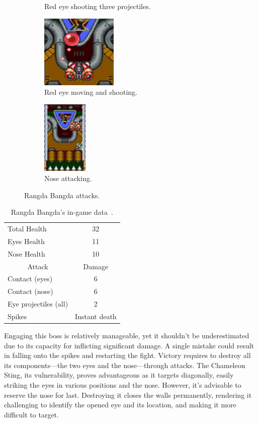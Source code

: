 \begin{figure}[htp]
\begin{subfigure}[t]{0.30\linewidth}
		\caption{Red eye shooting three projectiles.}
	\end{subfigure}
	\begin{subfigure}{0.40\linewidth}
		\centering
		\includegraphics[height=3.5cm]{figures/X1/Sigma_stages/Rangda_red_2.jpg}
		\caption{Red eye moving and shooting.}
	\end{subfigure}
	\begin{subfigure}{0.30\linewidth}
		\centering
		\includegraphics[height=3.5cm]{figures/X1/Sigma_stages/Rangda_nose.jpg}
		\caption{Nose attacking.}
	\end{subfigure}
	\caption{Rangda Bangda attacks.}
\end{figure} 
\begin{table}[htp]
	\centering
	\begin{tabular}[h]{l c}
		\toprule
		Total Health  & 32\\
		Eyes Health & 11\\
		Nose Health & 10\\
		\midrule
		\multicolumn{1}{c}{Attack} & \multicolumn{1}{c}{Damage}\\
		Contact (eyes) & 6\\
		Contact (nose) & 6\\
		Eye projectiles (all) & 2\\
		Spikes & Instant death\\
		\bottomrule
	\end{tabular}
	\caption{Rangda Bangda's in-game data~\cite{wiki:Rangda_bangda}. }
\end{table}

Engaging this boss is relatively manageable, yet it shouldn't be underestimated due to its capacity for inflicting significant damage. A single mistake could result in falling onto the spikes and restarting the fight. Victory requires to destroy all its components—the two eyes and the nose—through attacks. The Chameleon Sting, its vulnerability, proves advantageous as it targets diagonally, easily striking the eyes in various positions and the nose. However, it's advisable to reserve the nose for last. Destroying it closes the walls permanently, rendering it challenging to identify the opened eye and its location, and making it more difficult to target.


